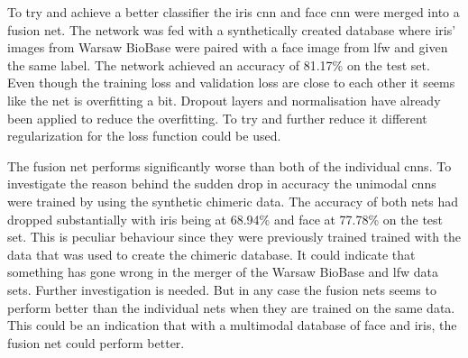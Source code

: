 To try and achieve a better classifier the iris \gls{cnn} and face \gls{cnn} were merged into a fusion net. The network was fed with a synthetically created database where iris' images from Warsaw BioBase were paired with a face image from \gls{lfw} and given the same label. The network achieved an accuracy of 81.17\% on the test set.  Even though the training loss and validation loss are close to each other it seems like the net is overfitting a bit. Dropout layers and normalisation have already been applied to reduce the overfitting. To try and further reduce it different regularization for the loss function could be used.

The fusion net performs significantly worse than both of the individual \gls{cnn}s. To investigate the reason behind the sudden drop in accuracy the unimodal \gls{cnn}s were trained by using the synthetic chimeric data. The accuracy of both nets had dropped substantially with iris being at 68.94\% and face at 77.78\% on the test set. This is peculiar behaviour since they were previously trained trained with the data that was used to create the chimeric database. It could indicate that something has gone wrong in the merger of the Warsaw BioBase and \gls{lfw} data sets. Further investigation is needed. But in any case the fusion nets seems to perform better than the individual nets when they are trained on the same data. This could be an indication that with a multimodal database of face and iris, the fusion net could perform better. 